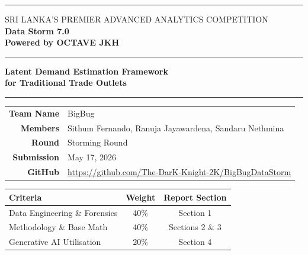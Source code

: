 \documentclass[11pt, a4paper]{article}
\begin{document}
\thispagestyle{empty}


\begin{center}
  \vspace*{0.4cm}

  {\color{primary}\rule{\linewidth}{2.5pt}}
  \vspace{0.3cm}

  {\fontsize{9}{11}\selectfont\color{midgray}\MakeUppercase{Sri Lanka's Premier Advanced Analytics Competition}}\\[4pt]
  {\fontsize{22}{26}\selectfont\bfseries\color{primary} Data Storm 7.0}\\[6pt]
  {\fontsize{13}{15}\selectfont\color{accent}\bfseries Powered by OCTAVE JKH}\\[4pt]
  {\color{primary}\rule{\linewidth}{2.5pt}}

  \vspace{1.0cm}

  {\fontsize{16}{20}\selectfont\bfseries\color{primary}
    Latent Demand Estimation Framework\\[4pt]
    for Traditional Trade Outlets}

  \vspace{0.6cm}
  {\color{midgray}\rule{0.5\linewidth}{0.4pt}}
  \vspace{0.6cm}

  \begin{tabular}{rl}
    \textbf{Team Name}   & BigBug \\[3pt]
    \textbf{Members}     & Sithum Fernando, Ranuja Jayawardena, Sandaru Nethmina \\[3pt]
    \textbf{Round}       & Storming Round \\[3pt]
    \textbf{Submission}  & May 17, 2026 \\[3pt]
    \textbf{GitHub}      & \url{https://github.com/The-DarK-Knight-2K/BigBugDataStorm} \\
  \end{tabular}

  \vspace{1.0cm}

  \begin{infobox}
    \begin{tabular}{lcc}
      \toprule
      \textbf{Criteria} & \textbf{Weight} & \textbf{Report Section} \\
      \midrule
      Data Engineering \& Forensics & 40\% & Section 1 \\
      Methodology \& Base Math      & 40\% & Sections 2 \& 3 \\
      Generative AI Utilisation     & 20\% & Section 4 \\
      \bottomrule
    \end{tabular}
  \end{infobox}


\end{center}
\end{document}
